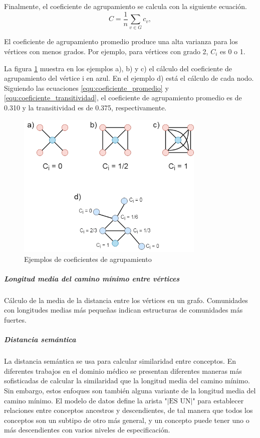 Finalmente, el coeficiente de agrupamiento se calcula con la siguiente ecuación.
\begin{equation}
\label{equ:coeficiente_promedio}
C = \frac{1}{n}\sum_{v \in G} c_v,
\end{equation}

El coeficiente de agrupamiento promedio produce una alta varianza para los vértices con menos grados. Por ejemplo, para vértices con grado 2, $C_{i}$ es 0 o 1.\cite{Tang2010} %

La figura \ref{fig:ejemplocoeficienteagrupamiento} muestra en los ejemplos a), b) y c) el cálculo del coeficiente de agrupamiento del vértice i en azul. En el ejemplo d) está el cálculo de cada nodo. Siguiendo las ecuaciones \ref{equ:coeficiente_promedio} y \ref{equ:coeficiente_transitividad}, el coeficiente de agrupamiento promedio es de \num{0.310} y la transitividad es de \num{0.375}, respectivamente.

\begin{figure}
\caption{Ejemplos de coeficientes de agrupamiento}
\label{fig:ejemplocoeficienteagrupamiento}
\centering
\includegraphics[width=0.8\textwidth]{Images/coeficiente_de_agrupamiento.png}
\end{figure}

\subparagraph{Longitud media del camino mínimo entre vértices}
Cálculo de la media de la distancia entre los vértices en un grafo. Comunidades con longitudes medias más pequeñas indican estructuras de comunidades más fuertes.

\subparagraph{Distancia semántica}
La distancia semántica se usa para calcular similaridad entre conceptos. En diferentes trabajos en el dominio médico \cite{Wang2010,Gan2013,Pedersen2007,Zare2015ASNOMED-CT} se presentan diferentes maneras más sofisticadas de calcular la similaridad que la longitud media del camino mínimo. Sin embargo, estos enfoques son también alguna variante de la longitud media del camino mínimo.
El modelo de datos define la arista "$|\text{ES UN}|$" para establecer relaciones entre conceptos ancestros y descendientes, de tal manera que todos los conceptos son un subtipo de otro más general, y un concepto puede tener uno o más descendientes con varios niveles de especificación.

